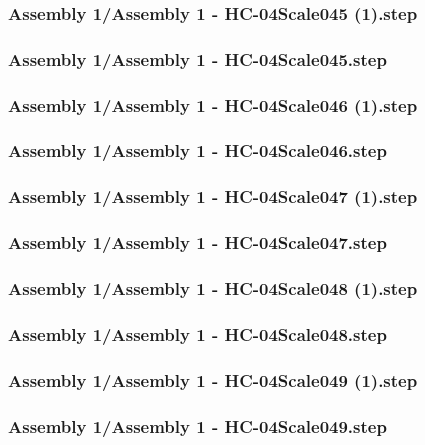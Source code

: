 \documentclass[a4paper,12pt]{article}
\begin{document}
\begin{lstlising}[language=C++]
\subsubsection{Assembly 1/Assembly 1 - HC-04Scale045 (1).step}

\subsubsection{Assembly 1/Assembly 1 - HC-04Scale045.step}

\subsubsection{Assembly 1/Assembly 1 - HC-04Scale046 (1).step}

\subsubsection{Assembly 1/Assembly 1 - HC-04Scale046.step}

\subsubsection{Assembly 1/Assembly 1 - HC-04Scale047 (1).step}

\subsubsection{Assembly 1/Assembly 1 - HC-04Scale047.step}

\subsubsection{Assembly 1/Assembly 1 - HC-04Scale048 (1).step}

\subsubsection{Assembly 1/Assembly 1 - HC-04Scale048.step}

\subsubsection{Assembly 1/Assembly 1 - HC-04Scale049 (1).step}

\subsubsection{Assembly 1/Assembly 1 - HC-04Scale049.step}


\end{lstlising}
\end{document}
